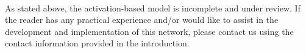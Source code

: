 \paragraph{}As stated above, the activation-based model is incomplete and under review.
If the reader has any practical experience and/or would like to assist in the
development and implementation of this network, please contact us using the
contact information provided in the introduction.
%
%
%
%
%
